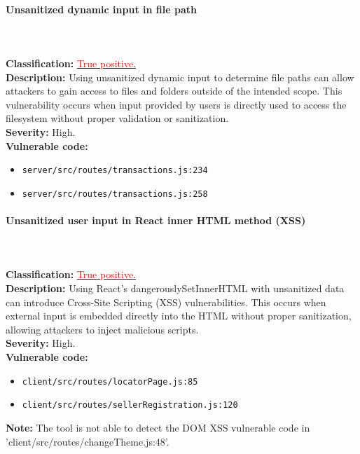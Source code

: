 \documentclass[]{article}
\begin{document}
\paragraph{Unsanitized dynamic input in file path} \mbox{} \\ \\
\textbf{Classification:} \hyperref[subsubsec:improper_limitation_of_a_pathname_to_a_restricted_directory]{\textcolor{red}{True} \textcolor{red}{positive}.} \\
\textbf{Description:} Using unsanitized dynamic input to determine file paths can allow attackers to gain access to files and folders outside of the intended scope. This vulnerability occurs when input provided by users is directly used to access the filesystem without proper validation or sanitization. \\ 
\textbf{Severity:} High. \\ 
\textbf{Vulnerable code:}
\begin{itemize}
    \item \texttt{server/src/routes/transactions.js:234}
    \item \texttt{server/src/routes/transactions.js:258}
\end{itemize}

\paragraph{Unsanitized user input in React inner HTML method (XSS)} \mbox{} \\ \\
\textbf{Classification:} \hyperref[subsubsec:cross_site_scripting]{\textcolor{red}{True} \textcolor{red}{positive}.} \\
\textbf{Description:} Using React's dangerouslySetInnerHTML with unsanitized data can introduce Cross-Site Scripting (XSS) vulnerabilities. This occurs when external input is embedded directly into the HTML without proper sanitization, allowing attackers to inject malicious scripts. \\ 
\textbf{Severity:} High. \\ 
\textbf{Vulnerable code:}
\begin{itemize}
    \item \texttt{client/src/routes/locatorPage.js:85}
    \item \texttt{client/src/routes/sellerRegistration.js:120}
\end{itemize}
\textbf{Note:} The tool is not able to detect the DOM XSS vulnerable code in 'client/src/routes/changeTheme.js:48'. \\
\end{document}
